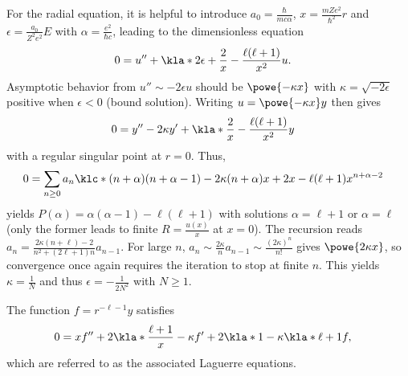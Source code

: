 \documentclass[english, parskip=full]{scrbook}
\newcommand{\note}[1]{\begin{tcolorbox}[colback=colorbackgroundnote,colframe=colornote, breakable,enhanced]#1\end{tcolorbox}}
\begin{document}
{For the radial equation, it is helpful to introduce $a_0=\frac{\hbar}{mc\alpha}$, $x = \frac{mZe^2}{\hbar^2}r$ and $\epsilon = \frac{a_0}{Z^2e^2}E$ with $\alpha = \frac{e^2}{\hbar c}$, leading to the dimensionless equation
\begin{align}
0 &= u'' + \kla*{2\epsilon + \frac{2}{x} - \frac{\ell(\ell + 1)}{x^2}} u.
\end{align}
Asymptotic behavior from $u''\sim -2\epsilon u$ should be $\powe{-\kappa x}$ with $\kappa = \sqrt{-2\epsilon}$ positive when $\epsilon < 0$ (bound solution).
Writing $u=\powe{-\kappa x} y$ then gives
\begin{align}
0 &= y'' - 2\kappa y' + \kla*{\frac{2}{x} - \frac{\ell (\ell + 1)}{x^2}} y
\end{align}
with a regular singular point at $r=0$.
Thus,
\begin{align}
0 &= \sum_{n\ge 0} a_n \klc*{(n+\alpha)(n+\alpha-1) - 2\kappa (n+\alpha) x + 2x - \ell (\ell + 1) } x^{n+\alpha-2}
\end{align}
yields $P(\alpha) = \alpha(\alpha-1) - \ell (\ell+1)$ with solutions $\alpha = \ell + 1$ or $\alpha=\ell$ (only the former leads to finite $R=\frac{u(x)}{x}$ at $x=0$).
The recursion reads $a_n = \frac{2\kappa (n+\ell) - 2}{n^2 + (2\ell + 1)n} a_{n-1}$.
For large $n$, $a_n \sim \frac{2\kappa}{n} a_{n-1} \sim \frac{(2\kappa)^n}{n!}$ gives $\powe{2\kappa x}$, so convergence once again requires the iteration to stop at finite $n$.
This yields $\kappa = \frac{1}{N}$ and thus $\epsilon = -\frac{1}{2N^2}$ with $N\ge 1$.
\note{The function $f = r^{-\ell-1} y$ satisfies 
\begin{align}
0 &= x f'' + 2\kla*{\frac{\ell+1}{x}-\kappa}f' + 2\kla*{1 - \kappa \kla*{\ell + 1}}f,
\end{align}
which are referred to as the associated Laguerre equations.
}
}
\end{document}
